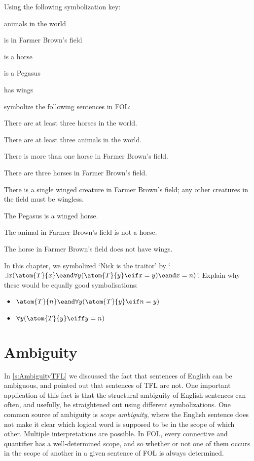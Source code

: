 \problempart Using the following symbolization key:
\begin{ekey}
\item[\text{domain}] animals in the world
\item[\atom{B}{x}]  is in Farmer Brown's field
\item[\atom{H}{x}]  is a horse
\item[\atom{P}{x}]  is a Pegasus
\item[\atom{W}{x}]  has wings
\end{ekey}
symbolize the following sentences in FOL:
\begin{compactlist}
\item There are at least three horses in the world.
\item There are at least three animals in the world.
\item There is more than one horse in Farmer Brown's field.
\item There are three horses in Farmer Brown's field.
\item There is a single winged creature in Farmer Brown's field; any other creatures in the field must be wingless.
\item The Pegasus is a winged horse.
\item The animal in Farmer Brown's field is not a horse.
\item The horse in Farmer Brown's field does not have wings.
\end{compactlist}

\problempart
In this chapter, we symbolized `Nick is the traitor' by `$\exists x (\atom{T}{x} \eand \forall y(\atom{T}{y} \eif x = y) \eand x = n)$'. Explain why these would be equally good symbolisations:
	\begin{itemize}
		\item $\atom{T}{n} \eand \forall y(\atom{T}{y} \eif n = y)$
		\item $\forall y(\atom{T}{y} \eiff y = n)$
	\end{itemize}


\chapter{Ambiguity}\label{s:ambiguityFOL}

In \cref{s:AmbiguityTFL} we discussed the fact that sentences of English can be ambiguous, and pointed out that sentences of TFL are not. One important application of this fact is that the structural ambiguity of English sentences can often, and usefully, be straightened out using different symbolizations.  One common source of ambiguity is \emph{scope ambiguity}, where the English sentence does not make it clear which logical word is supposed to be in the scope of which other. Multiple interpretations are possible.  In FOL, every connective and quantifier has a well-determined scope, and so whether or not one of them occurs in the scope of another in a given sentence of FOL is always determined.

